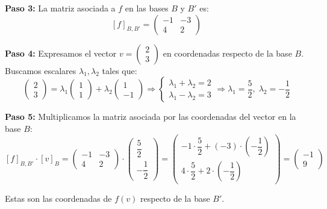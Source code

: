 \begin{ejemplo}
\vspace{0.5em}
\textbf{Paso 3:} La matriz asociada a \(f\) en las bases \(B\) y \(B'\) es:
\[
[f]_{B,B'} = \begin{pmatrix}
-1 & -3 \\
4 & 2
\end{pmatrix}
\]

\vspace{0.5em}
\textbf{Paso 4:} Expresamos el vector \(v = \begin{pmatrix}2 \\ 3\end{pmatrix}\) en coordenadas respecto de la base \(B\). Buscamos escalares \(\lambda_1, \lambda_2\) tales que:
\[
\begin{pmatrix}2 \\ 3\end{pmatrix} = \lambda_1 \begin{pmatrix}1 \\ 1\end{pmatrix} + \lambda_2 \begin{pmatrix}1 \\ -1\end{pmatrix}
\Rightarrow
\begin{cases}
\lambda_1 + \lambda_2 = 2 \\
\lambda_1 - \lambda_2 = 3
\end{cases}
\Rightarrow \lambda_1 = \dfrac{5}{2},\; \lambda_2 = -\dfrac{1}{2}
\]

\vspace{0.5em}
\textbf{Paso 5:} Multiplicamos la matriz asociada por las coordenadas del vector en la base \(B\):
\[
[f]_{B,B'} \cdot [v]_B = \begin{pmatrix}
-1 & -3 \\
4 & 2
\end{pmatrix} \cdot \begin{pmatrix}
\dfrac{5}{2} \\[4pt] -\dfrac{1}{2}
\end{pmatrix}
=
\begin{pmatrix}
-1 \cdot \dfrac{5}{2} + (-3) \cdot \left(-\dfrac{1}{2} \right) \\
4 \cdot \dfrac{5}{2} + 2 \cdot \left(-\dfrac{1}{2} \right)
\end{pmatrix}
=
\begin{pmatrix}
-1 \\ 9
\end{pmatrix}
\]

Estas son las coordenadas de \(f(v)\) respecto de la base \(B'\).


\end{ejemplo}
